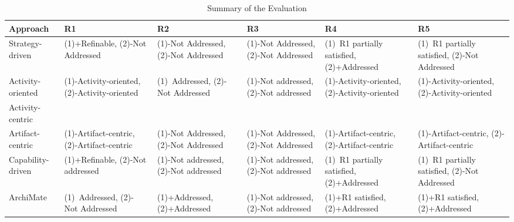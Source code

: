 \begin{table}[]
	\scriptsize 
	\centering
	\caption{Summary of the Evaluation}
	\label{tab:evaluationoftheapproach}
	\begin{tabular}{p{2cm}p{2.5cm}p{2.5cm}p{2.5cm}p{2.5cm}p{2.5cm}}
	\toprule
		Approach & R1               & R2               & R3         & R4       & R5        \\
	\midrule
	Strategy-driven & (1)+Refinable, (2)-Not Addressed  & (1)-Not Addressed, (2)-Not Addressed  & (1)-Not Addressed, (2)-Not Addressed  & (1)~R1 partially satisfied, (2)+Addressed  & (1)~R1 partially satisfied, (2)-Not Addressed \\
	Activity-oriented & (1)-Activity-oriented, (2)-Activity-oriented
	 &(1)~Addressed, (2)- Not Addressed  & (1)-Not addressed, (2)-Not addressed   &(1)-Activity-oriented, (2)-Activity-oriented  &(1)-Activity-oriented, (2)-Activity-oriented \\
	Activity-centric &  &  &  &  & \\
	Artifact-centric    & (1)-Artifact-centric, (2)-Artifact-centric  & (1)-Not Addressed, (2)-Not Addressed  & (1)-Not Addressed, (2)-Not Addressed  & (1)-Artifact-centric, (2)-Artifact-centric & (1)-Artifact-centric, (2)-Artifact-centric  \\ 
	Capability-driven   & (1)+Refinable, (2)-Not addressed & (1)-Not addressed, (2)-Not addressed   & (1)-Not addressed, (2)-Not addressed  & (1)~R1 partially satisfied, (2)+Addressed  & (1)~R1 partially satisfied, (2)-Not Addressed  \\
	ArchiMate  & (1)~Addressed, (2)- Not Addressed & (1)+Addressed, (2)+Addressed & (1)-Not addressed, (2)-Not addressed  & (1)+R1 satisfied, (2)+Addressed & (1)+R1 satisfied, (2)+Addressed\\
	\bottomrule     
	\end{tabular}
\end{table}



 


